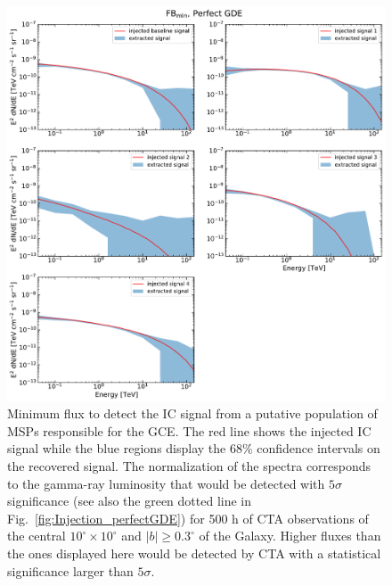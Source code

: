 \documentclass[doublespace,nopageskip]{VTthesis}
\begin{document}
\begin{figure}
    \begin{center}
    \includegraphics[width=\textwidth]{Figures/CTA/all-signal-spectra-mis-False-Fermi-min-True.pdf}
    \caption{Minimum flux to detect the IC signal from a putative population of MSPs responsible for the GCE. The red line shows the injected IC signal while the blue regions display the 68\% confidence intervals on the recovered signal. The normalization of the spectra corresponds to the gamma-ray luminosity that would be detected with $5\sigma$ significance (see also the green dotted line in Fig.~\ref{fig:Injection_perfectGDE}) for 500 h of CTA observations of the central $10^\circ\times10^\circ$ and $|b|\geq0.3^\circ$ of the Galaxy. Higher fluxes than the ones displayed here would be detected by CTA with a statistical significance larger than $5\sigma$.      }
    \label{fig:RecoveredSpectrum_perfectGDEFBmin}
    \end{center}
\end{figure}
\end{document}
